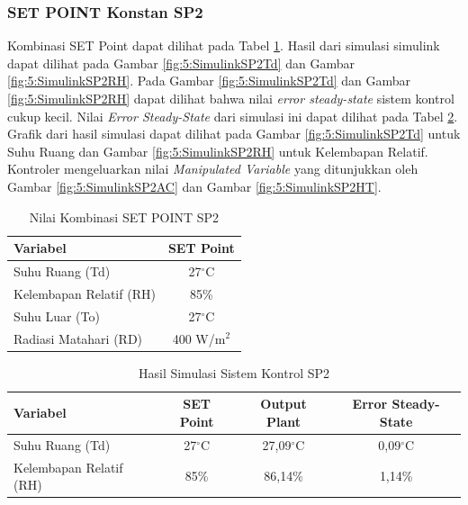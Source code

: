 \subsubsection{SET POINT Konstan SP2}

Kombinasi SET Point dapat dilihat pada Tabel \ref{tbl:5:SP2Combination}. Hasil dari simulasi simulink dapat dilihat pada Gambar \ref{fig:5:SimulinkSP2Td} dan Gambar \ref{fig:5:SimulinkSP2RH}. Pada Gambar \ref{fig:5:SimulinkSP2Td} dan Gambar \ref{fig:5:SimulinkSP2RH} dapat dilihat bahwa nilai \textit{error steady-state} sistem kontrol cukup kecil. Nilai \textit{Error Steady-State} dari simulasi ini dapat dilihat pada Tabel \ref{tbl:5:SP2Ess}. Grafik dari hasil simulasi dapat dilihat pada Gambar \ref{fig:5:SimulinkSP2Td} untuk Suhu Ruang dan Gambar \ref{fig:5:SimulinkSP2RH} untuk Kelembapan Relatif. Kontroler mengeluarkan nilai \textit{Manipulated Variable} yang ditunjukkan oleh Gambar \ref{fig:5:SimulinkSP2AC} dan Gambar \ref{fig:5:SimulinkSP2HT}.

\vspace{0.5em}
\begin{table}[!h]
	\caption{Nilai Kombinasi SET POINT SP2}
	\label{tbl:5:SP2Combination}
	\centering
	\begin{tabular}{|l|c|}
		\hline
		\textbf{Variabel} & \textbf{SET Point} \\ \hline
		Suhu Ruang (Td) & 27$^\circ$C          \\ \hline
		Kelembapan Relatif (RH) & 85\%         \\ \hline
		Suhu Luar (To) & 27$^\circ$C           \\ \hline
		Radiasi Matahari (RD) & 400 W/m$^2$    \\ \hline
	\end{tabular}
\end{table}

\begin{table}[!h]
	\caption{Hasil Simulasi Sistem Kontrol SP2}
	\label{tbl:5:SP2Ess}
	\centering
	\begin{tabular}{|l|c|c|c|}
		\hline
		\textbf{Variabel} & \textbf{SET Point} & \textbf{Output Plant} & \textbf{Error Steady-State}\\ \hline
		Suhu Ruang (Td) & 27$^\circ$C & 27,09$^\circ$C & 0,09$^\circ$C \\ \hline
		Kelembapan Relatif (RH) & 85\% & 86,14\% & 1,14\% \\ \hline
	\end{tabular}
\end{table}


